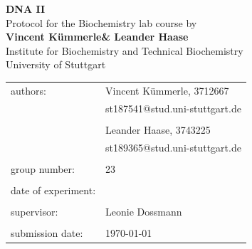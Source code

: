 \documentclass[a4paper,12pt,bibliography=totocnumbered,parskip=half,headsepline]{scrartcl}
\makeatletter
\newcommand{\VERSUCHSDATUM}{\DTMdisplaydate{2026}{3}{11}{-1}}
\newcommand{\PROTOKOLLDATUM}{\today}
\newcommand{\VerfasserEINS}{Vincent Kümmerle}
\newcommand{\MatNoEINS}{3712667}
\newcommand{\EmailEINS}{st187541@stud.uni-stuttgart.de}
\newcommand{\VerfasserZWEI}{Leander Haase}
\newcommand{\MatNoZWEI}{3743225}
\newcommand{\EmailZWEI}{st189365@stud.uni-stuttgart.de}
\newcommand{\BETREUER}{Leonie Dossmann}
\newcommand{\GRUPPENNR}{23}
\newcommand{\VERSUCHSNAME}{DNA II}
\makeatother
\begin{document}
\thispagestyle{empty}


\begin{titlepage}

\begin{center}
\Huge{\textbf{\VERSUCHSNAME}}\\
\vspace{10mm}%
\Large{Protocol for the Biochemistry lab course by \\ \textbf{\VerfasserEINS\;\& \VerfasserZWEI}}\\
\vspace{10mm}
\Large{Institute for Biochemistry and Technical Biochemistry}\\
\Large{University of Stuttgart}\\
\end{center}
\vspace{0cm}
\begin{center}
\begin{tabular}{ll}
\large{authors:}		& \large{\VerfasserEINS,} \large{\MatNoEINS} \\
 						& \large{\EmailEINS} \\
						\vspace{0cm}\\
						& \large{\VerfasserZWEI,} \large{\MatNoZWEI} \\
                        & \large{\EmailZWEI} \\
						\vspace{0cm}\\
\large{group number:}	& \large{\GRUPPENNR} \\
\vspace{0cm}\\
\large{date of experiment:}	& \large{\VERSUCHSDATUM} \\
\vspace{0cm}\\
\large{supervisor:}		& \large{\BETREUER} \\
\vspace{0cm}\\
\large{submission date:} & \large{\PROTOKOLLDATUM}
\end{tabular}
\end{center}

\vspace{1cm}


\end{titlepage}


\thispagestyle{empty}

\tableofcontents 
\end{document}
